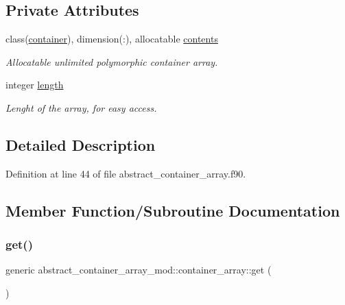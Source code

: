 \subsection*{Private Attributes}
\begin{DoxyCompactItemize}
\item 
class(\hyperlink{structcontainer__mod_1_1container}{container}), dimension(\+:), allocatable \hyperlink{structabstract__container__array__mod_1_1container__array_a506bf56ce508f7041b765c7d19959902}{contents}
\begin{DoxyCompactList}\small\item\em Allocatable unlimited polymorphic container array. \end{DoxyCompactList}\item 
integer \hyperlink{structabstract__container__array__mod_1_1container__array_a0ec81671d521b7a118a83e79f1d40b56}{length}
\begin{DoxyCompactList}\small\item\em Lenght of the array, for easy access. \end{DoxyCompactList}\end{DoxyCompactItemize}


\subsection{Detailed Description}


Definition at line 44 of file abstract\+\_\+container\+\_\+array.\+f90.



\subsection{Member Function/\+Subroutine Documentation}
\mbox{\label{structabstract__container__array__mod_1_1container__array_a3dfae16ca3f2afa43766e4241f73dd1b}} 
\subsubsection{\texorpdfstring{get()}{get()}}
{\footnotesize\ttfamily generic abstract\+\_\+container\+\_\+array\+\_\+mod\+::container\+\_\+array\+::get (\begin{DoxyParamCaption}{ }\end{DoxyParamCaption})\hspace{0.3cm}{\ttfamily [private]}}



